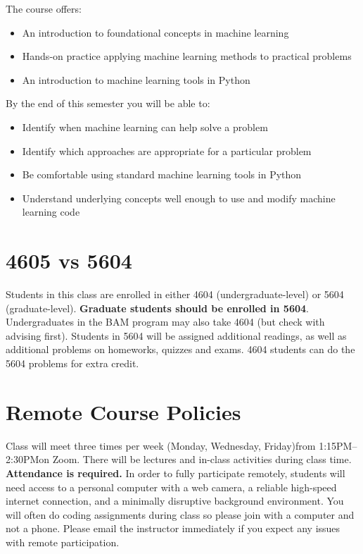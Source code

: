 \documentclass[10pt]{memoir}
\def\mymeetingdays{Monday, Wednesday, Friday}
\def\mymeetingtimes{1:15PM--2:30PM}
\begin{document}
The course offers:

\begin{itemize}
\item An introduction to foundational concepts in machine learning
\item Hands-on practice applying machine learning methods to practical problems
\item An introduction to machine learning tools in Python 
\end{itemize}

By the end of this semester you will be able to:
\begin{itemize}
\item Identify when machine learning can help solve a problem
\item Identify which approaches are appropriate for a particular problem
\item Be comfortable using standard machine learning tools in Python
\item Understand underlying concepts well enough to use and modify machine learning code
\end{itemize}

\section{\textbf{4605 vs 5604}}

Students in this class are enrolled in either 4604 (undergraduate-level) or 5604 (graduate-level). \textbf{Graduate students should be enrolled in 5604}. Undergraduates in the BAM program may also take 4604 (but check with advising first).
Students in 5604 will be assigned additional readings, as well as additional problems on homeworks, quizzes and exams.
4604 students can do the 5604 problems for extra credit.

\section{\textbf{Remote Course Policies}}
Class will meet three times per week (\mymeetingdays)\space from \mymeetingtimes\space on Zoom. There will be lectures and in-class activities during class time. \textbf{Attendance is required.} 
In order to fully participate remotely, students will need access to a personal computer with a web camera, a reliable high-speed internet connection, and a minimally disruptive background environment. 
{You will often do coding assignments during class so please join with a computer and not a phone}.
Please email the instructor immediately if you expect any issues with remote participation.
\end{document}
